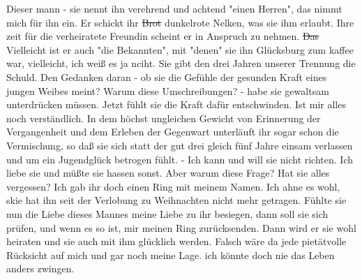 \def\day{{\color{red} [16. Mai 1944, fortgesetzt] }}
\mktitle

Dieser mann - sie nennt ihn verehrend und achtend "einen Herren", das nimmt mich f\"{u}r ihn ein.
Er schickt ihr \st{Brot} dunkelrote Nelken, was sie ihm erlaubt.
Ihre zeit f\"{u}r die verheiratete Freundin scheint er in Anspruch zu nehmen.
\st{Das} Vielleicht ist er auch "die Bekannten", mit "denen" sie ihn Gl\"{u}cksburg zum kaffee war, vielleicht, ich wei{\ss} es ja nciht.
Sie gibt den drei Jahren unserer Trennung die Schuld.
Den Gedanken daran - ob sie die Gef\"{u}hle der gesunden Kraft eines jungen Weibes meint? Warum diese Umschreibungen? - habe sie gewaltsam unterdr\"{u}cken m\"{u}ssen.
Jetzt f\"{u}hlt sie die Kraft daf\"{u}r entschwinden.
Ist mir alles noch verst\"{a}ndlich.
In dem h\"{o}chst ungleichen Gewicht von Erinnerung der Vergangenheit und dem Erleben der Gegenwart unterl\"{a}uft ihr sogar schon die Vermischung, so da{\ss} sie sich statt der gut drei gleich f\"{u}nf Jahre einsam verlassen und um ein Jugendgl\"{u}ck betrogen f\"{u}hlt.
- Ich kann und will sie nicht richten.
Ich liebe sie und m\"{u}{\ss}te sie hassen sonst.
Aber warum diese Frage?
Hat sie alles vergessen?
Ich gab ihr doch einen Ring mit meinem Namen.
Ich ahne es wohl, skie hat ihn seit der Verlobung zu Weihnachten nicht mehr getragen.
F\"{u}hlte sie nun die Liebe dieses Mannes meine Liebe zu ihr besiegen, dann soll sie sich pr\"{u}fen, und wenn es so ist, mir meinen Ring zur\"{u}cksenden.
Dann wird er sie wohl heiraten und sie auch mit ihm gl\"{u}cklich werden.
Falsch w\"{a}re da jede piet\"{a}tvolle R\"{u}cksicht auf mich und gar noch meine Lage. ich k\"{o}nnte doch nie das Leben anders zwingen.

\clearpage
